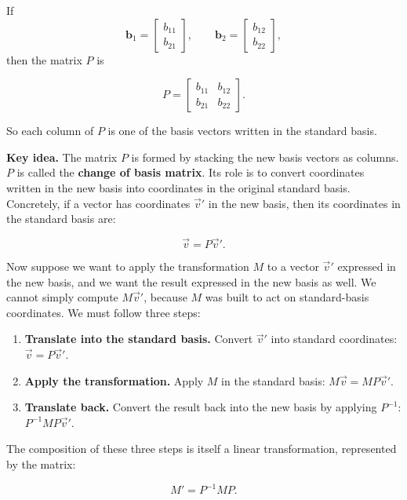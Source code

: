 \documentclass[11pt,openany]{book}
\theoremstyle{definition}
\begin{document}
\medskip

If
\[
\mathbf{b}_1 = \begin{bmatrix} b_{11} \\ b_{21} \end{bmatrix}, 
\qquad
\mathbf{b}_2 = \begin{bmatrix} b_{12} \\ b_{22} \end{bmatrix},
\]
then the matrix $P$ is

\[
P =
\begin{bmatrix}
b_{11} & b_{12} \\
b_{21} & b_{22}
\end{bmatrix}.
\]

\medskip

So each column of $P$ is one of the basis vectors written in the standard basis.

\medskip

\textbf{Key idea.} The matrix $P$ is formed by stacking the new basis vectors as columns.
$P$ is called the \textbf{change of basis matrix}. Its role is to convert coordinates 
written in the new basis into coordinates in the original standard basis. Concretely, 
if a vector has coordinates $\vec{v}'$ in the new basis, then its coordinates in the 
standard basis are:

\[
\vec{v} = P\vec{v}'.
\]

Now suppose we want to apply the transformation $M$ to a vector $\vec{v}'$ expressed 
in the new basis, and we want the result expressed in the new basis as well. 
We cannot simply compute $M\vec{v}'$, because $M$ was built to act on standard-basis 
coordinates. We must follow three steps:

\begin{enumerate}
  \item \textbf{Translate into the standard basis.} Convert $\vec{v}'$ into standard 
  coordinates: $\vec{v} = P\vec{v}'$.
  \item \textbf{Apply the transformation.} Apply $M$ in the standard basis: 
  $M\vec{v} = MP\vec{v}'$.
  \item \textbf{Translate back.} Convert the result back into the new basis by 
  applying $P^{-1}$: $P^{-1}MP\vec{v}'$.
\end{enumerate}

\medskip

The composition of these three steps is itself a linear transformation, represented by 
the matrix:

\[
M' = P^{-1}MP.
\]
\end{document}
